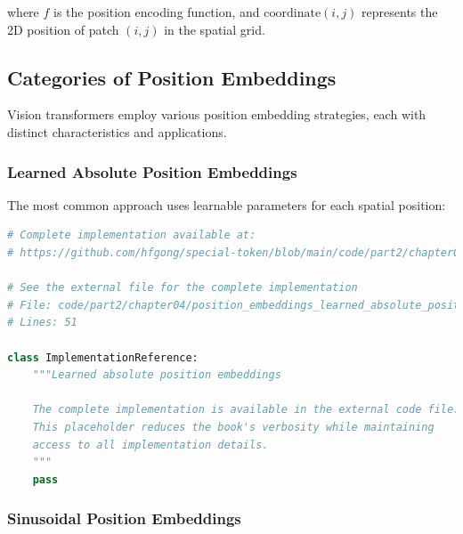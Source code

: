 where $f$ is the position encoding function, and $\text{coordinate}(i,j)$ represents the 2D position of patch $(i,j)$ in the spatial grid.

\subsection{Categories of Position Embeddings}

Vision transformers employ various position embedding strategies, each with distinct characteristics and applications.

\subsubsection{Learned Absolute Position Embeddings}

The most common approach uses learnable parameters for each spatial position:

\begin{lstlisting}[language=Python, caption={Learned absolute position embeddings}]
# Complete implementation available at:
# https://github.com/hfgong/special-token/blob/main/code/part2/chapter04/position_embeddings_learned_absolute_position_embe.py

# See the external file for the complete implementation
# File: code/part2/chapter04/position_embeddings_learned_absolute_position_embe.py
# Lines: 51

class ImplementationReference:
    """Learned absolute position embeddings
    
    The complete implementation is available in the external code file.
    This placeholder reduces the book's verbosity while maintaining
    access to all implementation details.
    """
    pass
\end{lstlisting}

\subsubsection{Sinusoidal Position Embeddings}


